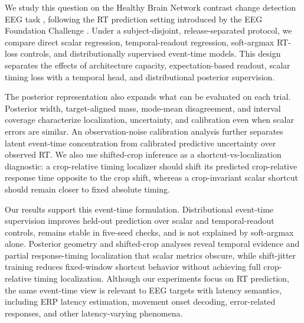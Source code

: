 \documentclass[12pt]{article}
\begin{document}
We study this question on the Healthy Brain Network contrast change detection EEG task \citep{Shirazi2024HBNEEG}, following the RT prediction setting introduced by the EEG Foundation Challenge \citep{EEGFoundationChallengeArxiv2025,EEGChallengeWebsite2025}. Under a subject-disjoint, release-separated protocol, we compare direct scalar regression, temporal-readout regression, soft-argmax RT-loss controls, and distributionally supervised event-time models. This design separates the effects of architecture capacity, expectation-based readout, scalar timing loss with a temporal head, and distributional posterior supervision.

The posterior representation also expands what can be evaluated on each trial. Posterior width, target-aligned mass, mode-mean disagreement, and interval coverage characterize localization, uncertainty, and calibration even when scalar errors are similar. An observation-noise calibration analysis further separates latent event-time concentration from calibrated predictive uncertainty over observed RT. We also use shifted-crop inference as a shortcut-vs-localization diagnostic: a crop-relative timing localizer should shift its predicted crop-relative response time opposite to the crop shift, whereas a crop-invariant scalar shortcut should remain closer to fixed absolute timing.

Our results support this event-time formulation. Distributional event-time supervision improves held-out prediction over scalar and temporal-readout controls, remains stable in five-seed checks, and is not explained by soft-argmax alone. Posterior geometry and shifted-crop analyses reveal temporal evidence and partial response-timing localization that scalar metrics obscure, while shift-jitter training reduces fixed-window shortcut behavior without achieving full crop-relative timing localization. Although our experiments focus on RT prediction, the same event-time view is relevant to EEG targets with latency semantics, including ERP latency estimation, movement onset decoding, error-related responses, and other latency-varying phenomena.
\end{document}

